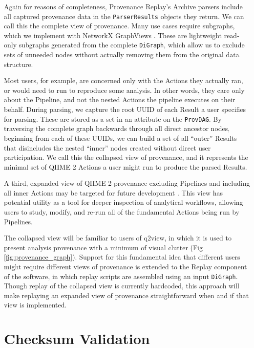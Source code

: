 Again for reasons of completeness, Provenance Replay’s Archive parsers include
all captured provenance data in the \texttt{ParserResults} objects they return. We can
call this the complete view of provenance. Many use cases require subgraphs,
which we implement with NetworkX GraphViews \parencite{hagberg_exploring_2008}.
These are lightweight read-only subgraphs generated from the complete \texttt{DiGraph},
which allow us to exclude sets of unneeded nodes without actually removing them
from the original data structure.

Most users, for example, are concerned only with the Actions they actually ran,
or would need to run to reproduce some analysis. In other words, they care only
about the Pipeline, and not the nested Actions the pipeline executes on their
behalf. During parsing, we capture the root UUID of each Result a user specifies
for parsing. These are stored as a set in an attribute on the \texttt{ProvDAG}. By
traversing the complete graph backwards through all direct ancestor nodes,
beginning from each of these UUIDs, we can build a set of all “outer” Results
that disincludes the nested “inner” nodes created without direct user
participation. We call this the collapsed view of provenance, and it represents
the minimal set of QIIME 2 Actions a user might run to produce the parsed
Results.

A third, expanded view of QIIME 2 provenance excluding Pipelines and including
all inner Actions may be targeted for future development \parencite[Issue #74]{keefe_issues_2021}.
This view has potential utility as a tool for deeper inspection of analytical
workflows, allowing users to study, modify, and re-run all of the fundamental
Actions being run by Pipelines. 

The collapsed view will be familiar to users of q2view, in which it is used to
present analysis provenance with a minimum of visual clutter (Fig \ref{fig:provenance_graph}).
Support for this fundamental idea that different users might require different
views of provenance is extended to the Replay component of the software, in
which replay scripts are assembled using an input \texttt{DiGraph}. Though replay of the
collapsed view is currently hardcoded, this approach will make replaying an
expanded view of provenance straightforward when and if that view is
implemented.


\section{Checksum Validation}

